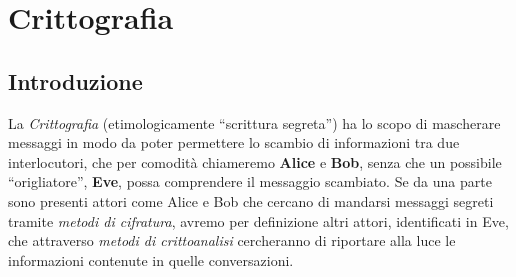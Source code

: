 \chapter{Crittografia}

\section{Introduzione}
La \textit{Crittografia} (etimologicamente ``scrittura segreta'') ha lo scopo di mascherare messaggi in modo da poter permettere lo scambio di informazioni tra due interlocutori, che per comodità chiameremo \textbf{Alice} e \textbf{Bob}, senza che un possibile ``origliatore'', \textbf{Eve}, possa comprendere il messaggio scambiato.
\newline
Se da una parte sono presenti attori come Alice e Bob che cercano di mandarsi messaggi segreti tramite \textit{metodi di cifratura}, avremo per definizione altri attori, identificati in Eve, che attraverso \textit{metodi di crittoanalisi} cercheranno di riportare alla luce le informazioni contenute in quelle conversazioni.

